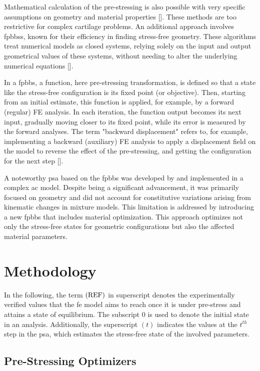 \documentclass[12pt,a4paper]{report}
\begin{document}
Mathematical calculation of the pre-stressing is also possible with very specific assumptions on geometry and material properties [\cite{alastru2007,rachev2003,taber1996}]. These methods are too restrictive for complex cartilage problems. An additional approach involves \acp{fpbbs}, known for their efficiency in finding stress-free geometry. These algorithms treat numerical models as closed systems, relying solely on the input and output geometrical values of these systems, without needing to alter the underlying numerical equations [\cite{leach2019}].

In a \ac{fpbbs}, a function, here pre-stressing transformation, is defined so that a state like the stress-free configuration is its fixed point (or objective). Then, starting from an initial estimate, this function is applied, for example, by a forward (regular) FE analysis. In each iteration, the function output becomes its next input, gradually moving closer to its fixed point, while its error is measured by the forward analyses. The term "backward displacement" refers to, for example, implementing a backward (auxiliary) FE analysis to apply a displacement field on the model to reverse the effect of the pre-stressing, and getting the configuration for the next step [\cite{leach2019}].

A noteworthy \ac{psa} based on the \ac{fpbbs} was developed by \cite{wang2018} and implemented in a complex \ac{ac} model. Despite being a significant advancement, it was primarily focused on geometry and did not account for constitutive variations arising from kinematic changes in mixture models. This limitation is addressed by introducing a new \ac{fpbbs} that includes material optimization. This approach optimizes not only the stress-free states for geometric configurations but also the affected material parameters.

\section{Methodology}
In the following, the term $\rm{(REF)}$ in superscript denotes the experimentally verified values that the \ac{fe} model aims to reach once it is under pre-stress and attains a state of equilibrium. The subscript $0$ is used to denote the initial state in an analysis. Additionally, the superscript $(t)$ indicates the values at the $t^{th}$ step in the \ac{psa}, which estimates the stress-free state of the involved parameters.

\subsection{Pre-Stressing Optimizers}
\end{document}
